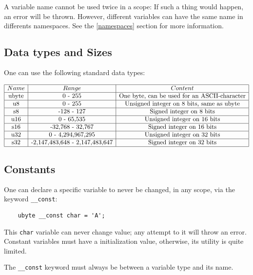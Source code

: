 \documentclass{scrartcl}
\begin{document}
            A variable name cannot be used twice in a scope: If such a thing
            would happen, an error will be thrown. However, different variables
            can have the same name in differents namespaces. See the \ref{namespaces}
            section for more information.
        \subsection{Data types and Sizes}
            One can use the following standard data types:

$\begin{array}{|c|c|c|}
\hline
Name & Range & Content\\
\hline
\text{ubyte} & \text{0 - 255} & \text{One byte, can be used for an ASCII-character}\\
\hline
\text{u8} & \text{0 - 255} & \text{Unsigned integer on 8 bits, same as ubyte}\\
\hline
\text{s8} & \text{-128 - 127} & \text{Signed integer on 8 bits}\\
\hline
\text{u16} & \text{0 - 65,535} & \text{Unsigned integer on 16 bits}\\
\hline
\text{s16} & \text{-32,768 - 32,767} & \text{Signed integer on 16 bits}\\
\hline
\text{u32} & \text{0 - 4,294,967,295} & \text{Unsigned integer on 32 bits}\\
\hline
\text{s32} & \text{-2,147,483,648 - 2,147,483,647} & \text{Signed integer on 32 bits}\\
\hline
\end{array}$
        \subsection{Constants} \label{const}
            One can declare a specific variable to never be changed, in any scope,
            via the keyword \texttt{\_\_const}:
            \begin{lstlisting}
    ubyte __const char = 'A';
            \end{lstlisting}
            This \texttt{char} variable can never change value; any attempt to it
            will throw an error.
            Constant variables must have a initialization value, otherwise, its
            utility is quite limited.

            The \texttt{\_\_const} keyword must always be between a variable
            type and its name.
\end{document}
